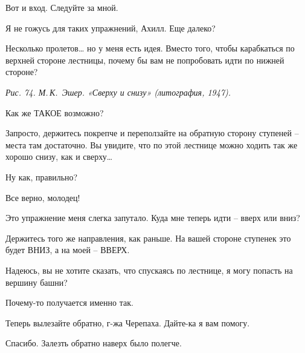 \documentclass[../main.tex]{subfiles}
\begin{document}
\begin{Dialogue}

 Вот и вход. Следуйте за мной.


 Я не гожусь для таких упражнений, Ахилл. Еще далеко?

 Несколько пролетов\ldots{} но у меня есть идея. Вместо того, чтобы карабкаться по верхней стороне лестницы, почему бы вам не попробовать идти по нижней стороне?

\emph{Рис. 74. М.\,К.~Эшер. «Сверху и снизу» (литография, 1947).}

 Как же ТАКОЕ возможно?

 Запросто, держитесь покрепче и переползайте на обратную сторону ступеней \--- места там достаточно. Вы увидите, что по этой лестнице можно ходить так же хорошо снизу, как и сверху\ldots{}

 Ну как, правильно?

 Все верно, молодец!

 Это упражнение меня слегка запутало. Куда мне теперь идти \--- вверх или вниз?

 Держитесь того же направления, как раньше. На вашей стороне ступенек это будет ВНИЗ, а на моей \--- ВВЕРХ.

 Надеюсь, вы не хотите сказать, что спускаясь по лестнице, я могу попасть на вершину башни?

 Почему-то получается именно так.


Теперь вылезайте обратно, г-жа Черепаха. Дайте-ка я вам помогу.


 Спасибо. Залезть обратно наверх было полегче.


\end{Dialogue}
\end{document}
